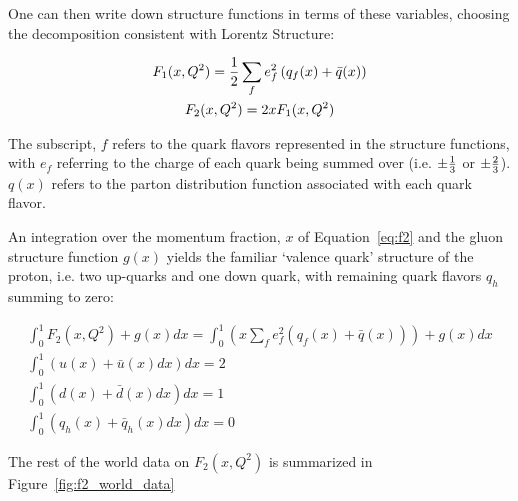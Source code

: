 {\noindent}One can then write down structure functions in terms of these
variables, choosing the decomposition consistent with Lorentz Structure:

\begin{gather}
  F_1(x,Q^2) = {1 \over 2}\sum_f e_f^2 \left(q_f(x)+\bar{q}(x)\right)
  \label{eq:f1} \\
  F_2(x,Q^2) = 2xF_1(x,Q^2)\label{eq:f2}
\end{gather}

The subscript, $f$ refers to the quark flavors represented in the structure
functions, with $e_f$ referring to the charge of each quark being summed over
(i.e. ${\pm}{1\over3}$ or ${\pm}{2\over3}$). $q(x)$ refers to the parton
distribution function associated with each quark flavor. 

An integration over the momentum fraction, $x$ of Equation~\ref{eq:f2} and the
gluon structure function $g(x)$ yields the familiar `valence quark' structure of
the proton, i.e. two up-quarks and one down quark, with remaining quark flavors
$q_h$ summing to zero:

\begin{gather}
	\int_0^1 F_2(x,Q^2) + g(x) dx 
	= \int_0^1 
	\left(
		x\sum_f e_f^2 \left(q_f(x)+\bar{q}(x)\right) 
	\right) 
	+ g(x) dx \label{eq:f2_int_1} \\
	\int_0^1 \left(u(x)+\bar{u}(x) dx \right) dx = 2  \label{eq:up_quark_valence} \\
	\int_0^1 \left(d(x)+\bar{d}(x) dx \right) dx = 1  \label{eq:down_quark_valence} \\
	\int_0^1 \left(q_h(x)+\bar{q}_h(x) dx \right) dx = 0 \label{eq:other_quark_valence}
\end{gather}

The rest of the world data on $F_2(x,Q^2)$ is summarized in
Figure~\ref{fig:f2_world_data}

